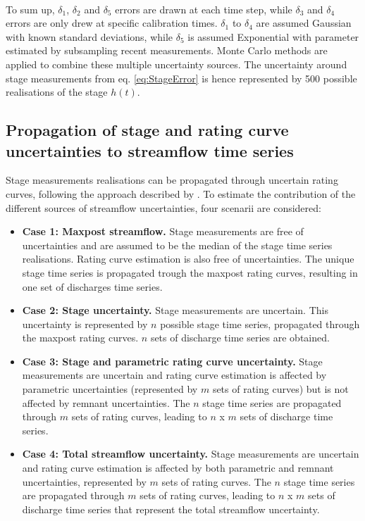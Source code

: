 \documentclass[11pt]{article}
\begin{document}
\begin{itemize}
    \end{itemize}
    
    \paragraph{}
    To sum up, $\delta_1$, $\delta_2$ and $\delta_5$ errors are drawn at each time step, while $\delta_3$ and $\delta_4$ errors are only drew at specific calibration times. $\delta_1$ to $\delta_4$ are assumed Gaussian with known standard deviations, while $\delta_5$ is assumed Exponential with parameter estimated by subsampling recent measurements. Monte Carlo methods are applied to combine these multiple uncertainty sources. The uncertainty around stage measurements from eq. \ref{eq:StageError} is hence represented by 500 possible realisations of the stage $h(t)$.
   
   \subsection{Propagation of stage and rating curve uncertainties to streamflow time series}
   
   Stage measurements realisations can be propagated through uncertain rating curves, following the approach described by \citet{horner_impact_2018}. To estimate the contribution of the different sources of streamflow uncertainties, four scenarii are considered:
   
   \begin{itemize}
       \item \textbf{Case 1: Maxpost streamflow.} Stage measurements are free of uncertainties and are assumed to be the median of the stage time series realisations. Rating curve estimation is also free of uncertainties. The unique stage time series is propagated trough the maxpost rating curves, resulting in one set of discharges time series. 
       \item \textbf{Case 2: Stage uncertainty.} Stage measurements are uncertain. This uncertainty is represented by $n$ possible stage time series, propagated through the maxpost rating curves. $n$ sets of discharge time series are obtained.
       \item \textbf{Case 3: Stage and parametric rating curve uncertainty.} Stage measurements are uncertain and rating curve estimation is affected by parametric uncertainties (represented by $m$ sets of rating curves) but is not affected by remnant uncertainties. The $n$ stage time series are propagated through $m$ sets of rating curves, leading to $n$ x $m$ sets of discharge time series. 
       \item \textbf{Case 4: Total streamflow uncertainty.} Stage measurements are uncertain and rating curve estimation is affected by both parametric and remnant uncertainties, represented by $m$ sets of rating curves. The $n$ stage time series are propagated through $m$ sets of rating curves, leading to $n$ x $m$ sets of discharge time series that represent the total streamflow uncertainty.
   \end{itemize}
   
\end{document}
